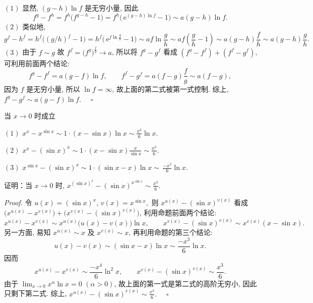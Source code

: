 $(1)$ 显然, $(g-h)\ln f$ 是无穷小量, 因此
\[
f^{g}-f^{h}=f^{h}\big(f^{g-h}-1\big)=f^{h}\big(\,\mathrm{e}^{(g-h)\ln f}-1\big)\sim a(g-h)\ln f.~
\]
 $(2)$ 类似地, 
\[
g^{f}-h^{f}=h^{f}\big((g/h)^{f}-1\big)=h^{f}\big(\,\mathrm{e}^{f\ln\frac{g}{h}}-1\big)\sim af\ln\frac{g}{h}\sim af\left(\frac{g}{h}-1\right)\sim a(g-h)\frac{f}{h}\sim a(g-h)\frac{g}{h}.~
\]
 $(3)$ 由于 $f\sim g$ 故 $f^{f}=\big(f^{g}\big)^{\frac{f}{g}}\to a$,
所以将 $f^{g}-g^{f}$ 看成 $(f^{g}-f^{f})+(f^{f}-g^{f})$, 可利用前面两个结论: 
\[
f^{g}-f^{f}=a(g-f)\ln f,\qquad f^{f}-g^{f}=a(f-g)\frac{f}{g}\sim a(f-g),~
\]
因为 $f$ 是无穷小量, 所以 $\ln f=\infty$, 故上面的第二式被第一式控制. 综上, $f^{g}-g^{f}\sim a(g-f)\ln f.$ $\quad\square$
\begin{corollary}{}
当 $x\to0$ 时成立

$(1)$ $x^{x}-x^{\sin x}\sim1\cdot(x-\sin x)\ln x\sim\frac{x^{3}}{6}\ln x.$

$(2)$ $x^{x}-(\sin x)^{x}\sim1\cdot(x-\sin x)\frac{x}{\sin x}\sim\frac{x^{3}}{6}.$

$(3)$ $x^{\sin x}-(\sin x)^{x}\sim1\cdot(\sin x-x)\ln x\sim\,\frac{-x^{3}}{6}\ln x.$
\end{corollary}
\begin{exercise}{}
证明：当 $x\to0$ 时, $x^{(\sin x)^{x}}-(\sin x)^{x^{\sin x}}\sim\frac{x^{3}}{6}.$ 
\end{exercise}
\textsl{Proof.} 令 $u(x)=(\sin x)^{x}$, $v(x)=x^{\sin x},$ 则 $x^{u(x)}-(\sin x)^{v(x)}$
看成 $\big(x^{u(x)}-x^{v(x)}\big)+\big(x^{v(x)}-(\sin x)^{v(x)}\big)$,
利用命题前面两个结论: 
\[
x^{u(x)}-x^{v(x)}\sim x^{u(x)}\big(u(x)-v(x)\big)\ln x,\qquad x^{v(x)}-(\sin x)^{v(x)}\sim x^{v(x)}(x-\sin x).~
\]
另一方面, 易知 $x^{u(x)}\sim x$ 及 $x^{v(x)}\sim x$, 再利用命题的第三个结论: 
\[
u(x)-v(x)\sim(\sin x-x)\ln x\sim\frac{-x^{3}}{6}\ln x.~
\]
因而 
\[
x^{u(x)}-x^{v(x)}\sim\frac{-x^{4}}{6}\ln^{2}x,\qquad x^{v(x)}-(\sin x)^{v(x)}\sim\frac{x^{3}}{6}.~
\]
由于 ${\displaystyle \lim_{x\to0}x^{\alpha}\ln x=0}$ $(\alpha>0)$,
故上面的第一式是第二式的高阶无穷小, 因此只剩下第二式. 综上, $x^{u(x)}-(\sin x)^{v(x)}\sim\frac{x^{3}}{6}.$ $\quad\square$
